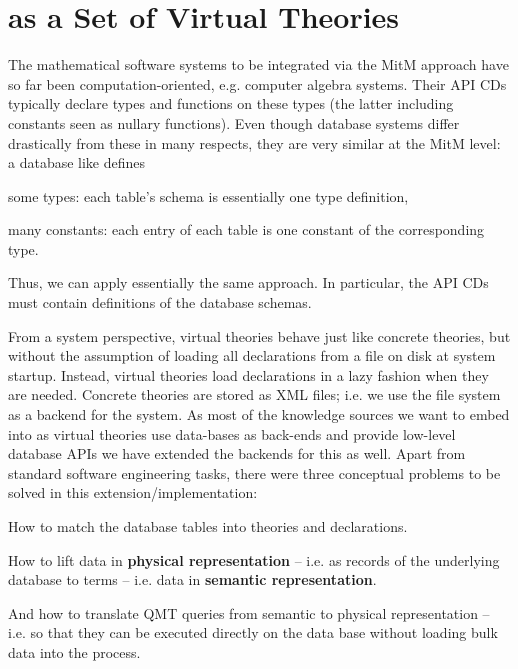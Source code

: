 \section{\lmfdb as a Set of Virtual Theories}\label{sec:vt}

The mathematical software systems to be integrated via the MitM approach have so far been computation-oriented, e.g. computer algebra systems.
Their API CDs typically declare types and functions on these types (the latter including constants seen as nullary functions).
Even though database systems differ drastically from these in many respects, they are very similar at the MitM level: a database like \lmfdb defines
\begin{compactitem}
 \item some types: each table's schema is essentially one type definition,
 \item many constants: each entry of each table is one constant of the corresponding type.
\end{compactitem}
Thus, we can apply essentially the same approach.
In particular, the API CDs must contain definitions of the database schemas. 

From a system perspective, virtual theories behave just like concrete theories, but without the assumption of loading all declarations from a file on disk at system startup.
Instead, virtual theories load declarations in a lazy fashion when they are needed. 
Concrete theories are stored as XML files; i.e. we use the file system as a backend for the \mmt system. 
As most of the knowledge sources we want to embed into \ommt as virtual theories use data-bases as back-ends and provide low-level database APIs we have extended the \mmt backends for this as well.
Apart from standard software engineering tasks, there were three conceptual problems to be solved in this extension/implementation:
\begin{compactenum}[\bf P1]
\item How to match the database tables into \ommt theories and declarations. 
\item How to lift data in \textbf{physical representation} -- i.e. as records of the
  underlying database to \ommt terms -- i.e. data in \textbf{semantic representation}.
\item And how to translate QMT queries from semantic to physical representation -- i.e. so
  that they can be executed directly on the data base without loading bulk data into the
  \mmt process.
\end{compactenum}

